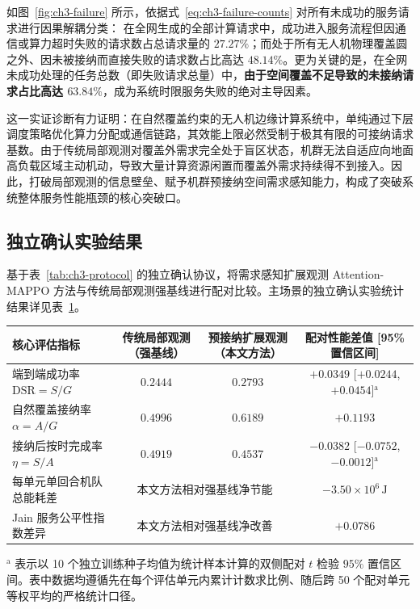 如图~\ref{fig:ch3-failure} 所示，依据式~\eqref{eq:ch3-failure-counts} 对所有未成功的服务请求进行因果解耦分类：
在全网生成的全部计算请求中，成功进入服务流程但因通信或算力超时失败的请求数占总请求量的 $27.27\%$；而处于所有无人机物理覆盖圆之外、因未被接纳而直接失败的请求数占比高达 $48.14\%$。更为关键的是，在全网未成功处理的任务总数（即失败请求总量）中，\textbf{由于空间覆盖不足导致的未接纳请求占比高达 $63.84\%$}，成为系统时限服务失败的绝对主导因素。

这一实证诊断有力证明：在自然覆盖约束的无人机边缘计算系统中，单纯通过下层调度策略优化算力分配或通信链路，其效能上限必然受制于极其有限的可接纳请求基数。由于传统局部观测对覆盖外需求完全处于盲区状态，机群无法自适应向地面高负载区域主动机动，导致大量计算资源闲置而覆盖外需求持续得不到接入。因此，打破局部观测的信息壁垒、赋予机群预接纳空间需求感知能力，构成了突破系统整体服务性能瓶颈的核心突破口。

\subsection{独立确认实验结果}
\label{sec:upper-results}
\label{sec:ch3-main-results}

基于表~\ref{tab:ch3-protocol} 的独立确认协议，将需求感知扩展观测 Attention-MAPPO 方法与传统局部观测强基线进行配对比较。主场景的独立确认实验统计结果详见表~\ref{tab:upper-confirmation}。

\begin{table}[!htbp]
    \centering
    \label{tab:upper-confirmation}
    \footnotesize
    \setlength{\tabcolsep}{6pt}
    \begin{tabular}{lccc}
        \toprule
        核心评估指标 & 传统局部观测（强基线） & 预接纳扩展观测（本文方法） & 配对性能差值 [95\% 置信区间] \\
        \midrule
        端到端成功率 $\mathrm{DSR} = S/G$ & $0.2444$ & $0.2793$ & $+0.0349$ [$+0.0244$, $+0.0454$]$^{\mathrm{a}}$ \\
        自然覆盖接纳率 $\alpha = A/G$ & $0.4996$ & $0.6189$ & $+0.1193$ \\
        接纳后按时完成率 $\eta = S/A$ & $0.4919$ & $0.4537$ & $-0.0382$ [$-0.0752$, $-0.0012$]$^{\mathrm{a}}$ \\
        每单元单回合机队总能耗差 & \multicolumn{2}{c}{本文方法相对强基线净节能} & $-3.50\times 10^6\,\mathrm{J}$ \\
        Jain 服务公平性指数差异 & \multicolumn{2}{c}{本文方法相对强基线净改善} & $+0.0786$ \\
        \bottomrule
    \end{tabular}
    \begin{minipage}{0.92\textwidth}
        \vspace{1ex}
        \footnotesize $^{\mathrm{a}}$ 表示以 10 个独立训练种子均值为统计样本计算的双侧配对 $t$ 检验 $95\%$ 置信区间。表中数据均遵循先在每个评估单元内累计计数求比例、随后跨 50 个配对单元等权平均的严格统计口径。
    \end{minipage}
\end{table}

